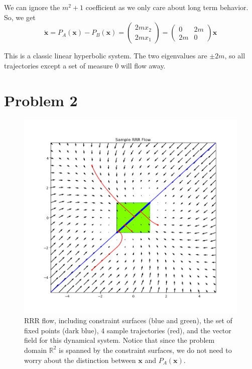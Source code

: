 \documentclass[psamsfonts]{amsart}
\theoremstyle{definition}
\theoremstyle{remark}
\numberwithin{equation}{section}
\begin{document}
We can ignore the $m^2 + 1$ coefficient as we only care about long term behavior.
So, we get
\[
\dot{\mathbf{x}} = 
P_A(\mathbf{x}) - P_B(\mathbf{x}) = 
\left(
\begin{matrix}
2mx_2 \\ 2mx_1
\end{matrix}
\right) 
= 
\left(
\begin{matrix}
0 & 2m \\
2m & 0
\end{matrix}
\right)
\mathbf{x}
\]


This is a classic linear hyperbolic system. The two eigenvalues are $\pm 2m$, so all trajectories except a set of measure $0$ will flow away.


\section{Problem 2}

\begin{figure}[H]
\centering
\includegraphics[width=\textwidth]{RRR_flow_final.png}
\caption{RRR flow, 
including constraint surfaces (blue and green), 
the set of fixed points (dark blue), 
4 sample trajectories (red), 
and the vector field for this dynamical system. 
Notice that since the problem domain $\mathbb{R}^2$ is spanned by the constraint surfaces, 
we do not need to worry about the distinction between $\mathbf{x}$ and $P_A(\mathbf{x})$.}
\label{fig2}
\end{figure}
\end{document}
